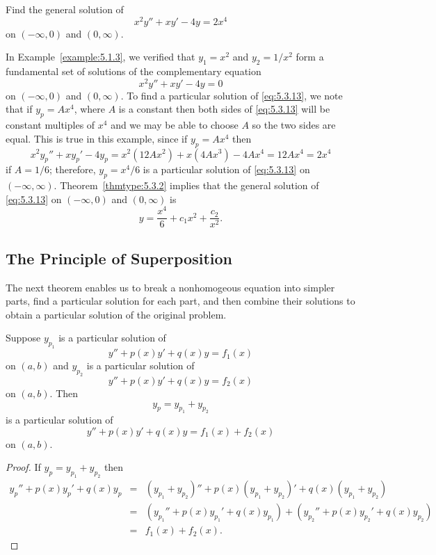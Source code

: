 \documentclass{ximera}
\begin{document}
\begin{example}\label{example:5.3.3}
Find the general solution of
\begin{equation} \label{eq:5.3.13}
x^2y''+xy'-4y=2x^4
\end{equation}
on $(-\infty,0)$ and $(0,\infty)$.
 
 
\begin{explanation}
In Example~\ref{example:5.1.3},  we verified that $y_1=x^2$ and $y_2=1/x^2$
form a fundamental set of solutions of the complementary equation
$$
x^2y''+xy'-4y=0
$$
on $(-\infty,0)$ and $(0,\infty)$.  To find a particular solution of
\eqref{eq:5.3.13}, we note that if
$y_p=Ax^4$, where $A$ is a constant then  both sides of \eqref{eq:5.3.13}
will be constant
multiples  of $x^4$ and  we may be able to choose  $A$ so the two sides
are equal. This is true in this example, since if $y_p=Ax^4$ then
$$
x^2y_p''+xy_p'-4y_p=x^2(12Ax^2)+x(4Ax^3)-4Ax^4=12Ax^4=2x^4
$$
if $A=1/6$;  therefore, $y_p=x^4/6$ is a particular solution of
\eqref{eq:5.3.13} on  $(-\infty,\infty)$.
Theorem~\ref{thmtype:5.3.2} implies that the general solution of
\eqref{eq:5.3.13} on  $(-\infty,0)$ and  $(0,\infty)$ is
$$
y=\frac{x^4}{6}+c_1x^2+\frac{c_2}{x^2}.
$$
\end{explanation}
\end{example}
 
\subsection*{The Principle of Superposition}
 
The next theorem enables us to break a nonhomogeous equation into
simpler parts, find a particular solution for each part, and then
combine their solutions to obtain a particular solution of the
original problem.
 
\begin{theorem}
\label{thmtype:5.3.3}
Suppose  $y_{p_1}$ is a particular solution of
$$
y''+p(x)y'+q(x)y=f_1(x)
$$
on $(a,b)$ and $y_{p_2}$ is a particular solution of
$$
y''+p(x)y'+q(x)y=f_2(x)
$$
on   $(a,b)$.
 Then
$$
y_p=y_{p_1}+y_{p_2}
$$
is a particular  solution of
$$
y''+p(x)y'+q(x)y=f_1(x)+f_2(x)
$$
on  $(a,b)$.
\end{theorem}
 
\begin{proof} If $y_p=y_{p_1}+y_{p_2}$ then
\begin{eqnarray*}
y_p''+p(x)y_p'+q(x)y_p&=&(y_{p_1}+y_{p_2})''+p(x)(y_{p_1}+y_{p_2})'
+q(x)(y_{p_1}+y_{p_2})\\
&=&\left(y_{p_1}''+p(x)y_{p_1}'+q(x)y_{p_1}\right)
+\left(y_{p_2}''+p(x)y_{p_2}'+q(x)y_{p_2}\right)\\
&=&f_1(x)+f_2(x).
\end{eqnarray*}
\end{proof}
 
\end{document}

